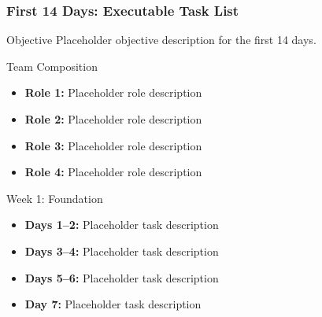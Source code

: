\begin{frame}
\frametitle{First 14 Days: Executable Task List}
\begin{block}{Objective}
Placeholder objective description for the first 14 days.
\end{block}

\begin{block}{Team Composition}
\begin{itemize}
\item \textbf{Role 1:} Placeholder role description
\item \textbf{Role 2:} Placeholder role description
\item \textbf{Role 3:} Placeholder role description
\item \textbf{Role 4:} Placeholder role description
\end{itemize}
\end{block}

\begin{block}{Week 1: Foundation}
\begin{itemize}
\item \textbf{Days 1--2:} Placeholder task description
\item \textbf{Days 3--4:} Placeholder task description
\item \textbf{Days 5--6:} Placeholder task description
\item \textbf{Day 7:} Placeholder task description
\end{itemize}
\end{block}
\end{frame}

